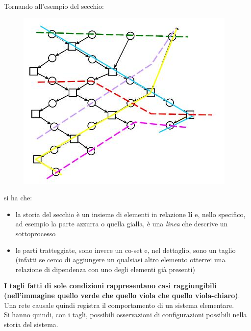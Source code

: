 \documentclass[a4paper,12pt, oneside]{book}
\begin{document}
\begin{esempio}
  Tornando all'esempio del secchio:
  \begin{figure}[H]
    \centering
    \includegraphics[scale = 0.5]{img/ta.jpg} 
  \end{figure}
  si ha che:
  \begin{itemize}
    \item la storia del secchio è un insieme di elementi in relazione
    \textbf{li} e, nello specifico, ad esempio la parte azzurra o quella gialla,
    è una \textit{linea} che descrive un sottoprocesso
    \item le parti tratteggiate, sono invece
    un co-set e, nel dettaglio, sono un 
    taglio (infatti se cerco di aggiungere un qualsiasi altro elemento otterrei
    una relazione di dipendenza con uno degli elementi già presenti)
  \end{itemize}
\end{esempio}
\textbf{I tagli fatti di sole condizioni rappresentano casi raggiungibili
  (nell'immagine quello verde che quello viola che quello viola-chiaro)}.\\
Una rete causale quindi registra il comportamento di un sistema elementare.\\
Si hanno quindi, con i tagli, possibili osservazioni di configurazioni possibili
nella storia del sistema.
\end{document}
